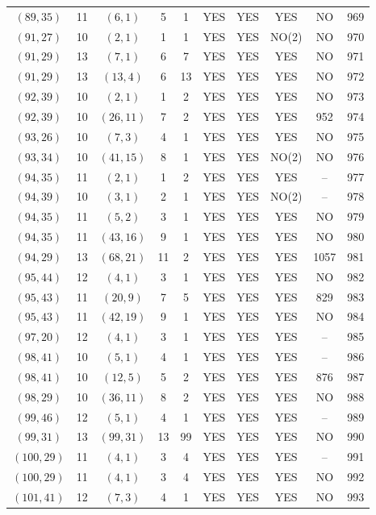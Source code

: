 \begin{longtable}{|c|c|c|c|c|c|c|c|c|c|}
$(89, 35)$ & 11 & $(6, 1)$ & 5 & 1 & YES & YES & YES & NO & 969\\
$(91, 27)$ & 10 & $(2, 1)$ & 1 & 1 & YES & YES & NO(2) & NO & 970\\
$(91, 29)$ & 13 & $(7, 1)$ & 6 & 7 & YES & YES & YES & NO & 971\\
$(91, 29)$ & 13 & $(13, 4)$ & 6 & 13 & YES & YES & YES & NO & 972\\
$(92, 39)$ & 10 & $(2, 1)$ & 1 & 2 & YES & YES & YES & NO & 973\\
$(92, 39)$ & 10 & $(26, 11)$ & 7 & 2 & YES & YES & YES & 952 & 974\\
$(93, 26)$ & 10 & $(7, 3)$ & 4 & 1 & YES & YES & YES & NO & 975\\
$(93, 34)$ & 10 & $(41, 15)$ & 8 & 1 & YES & YES & NO(2) & NO & 976\\
$(94, 35)$ & 11 & $(2, 1)$ & 1 & 2 & YES & YES & YES & -- & 977\\
$(94, 39)$ & 10 & $(3, 1)$ & 2 & 1 & YES & YES & NO(2) & -- & 978\\
$(94, 35)$ & 11 & $(5, 2)$ & 3 & 1 & YES & YES & YES & NO & 979\\
$(94, 35)$ & 11 & $(43, 16)$ & 9 & 1 & YES & YES & YES & NO & 980\\
$(94, 29)$ & 13 & $(68, 21)$ & 11 & 2 & YES & YES & YES & 1057 & 981\\
$(95, 44)$ & 12 & $(4, 1)$ & 3 & 1 & YES & YES & YES & NO & 982\\
$(95, 43)$ & 11 & $(20, 9)$ & 7 & 5 & YES & YES & YES & 829 & 983\\
$(95, 43)$ & 11 & $(42, 19)$ & 9 & 1 & YES & YES & YES & NO & 984\\
$(97, 20)$ & 12 & $(4, 1)$ & 3 & 1 & YES & YES & YES & -- & 985\\
$(98, 41)$ & 10 & $(5, 1)$ & 4 & 1 & YES & YES & YES & -- & 986\\
$(98, 41)$ & 10 & $(12, 5)$ & 5 & 2 & YES & YES & YES & 876 & 987\\
$(98, 29)$ & 10 & $(36, 11)$ & 8 & 2 & YES & YES & YES & NO & 988\\
$(99, 46)$ & 12 & $(5, 1)$ & 4 & 1 & YES & YES & YES & -- & 989\\
$(99, 31)$ & 13 & $(99, 31)$ & 13 & 99 & YES & YES & YES & NO & 990\\
$(100, 29)$ & 11 & $(4, 1)$ & 3 & 4 & YES & YES & YES & -- & 991\\
$(100, 29)$ & 11 & $(4, 1)$ & 3 & 4 & YES & YES & YES & NO & 992\\
$(101, 41)$ & 12 & $(7, 3)$ & 4 & 1 & YES & YES & YES & NO & 993\\

\end{longtable}

